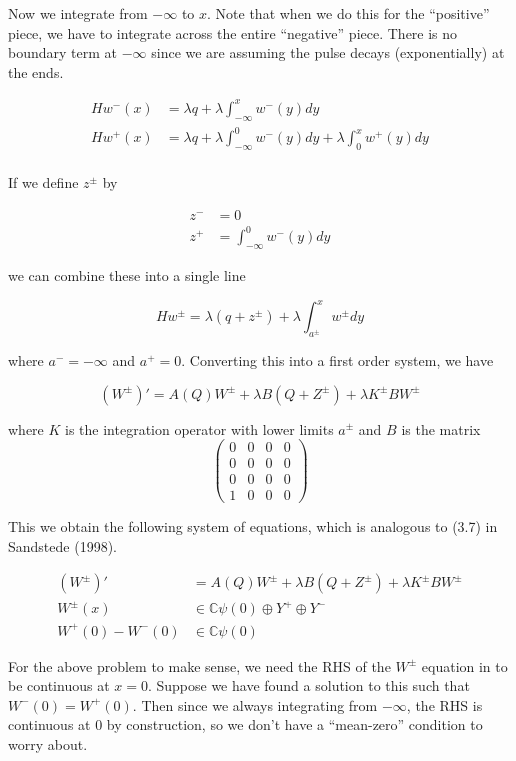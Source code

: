 \documentclass[12pt]{article}
\def\C{{\mathbb C}}
\begin{document}
Now we integrate from $-\infty$ to $x$. Note that when we do this for the ``positive'' piece, we have to integrate across the entire ``negative'' piece. There is no boundary term at $-\infty$ since we are assuming the pulse decays (exponentially) at the ends.

\begin{align*}
H w^-(x) &= \lambda q + \lambda \int_{-\infty}^x w^-(y) dy \\
H w^+(x) &= \lambda q + \lambda \int_{-\infty}^0 w^-(y) dy + \lambda \int_0^x w^+(y) dy \\
\end{align*}

If we define $z^\pm$ by

\begin{align*}
z^- &= 0 \\
z^+ &= \int_{-\infty}^0 w^-(y) dy
\end{align*}

we can combine these into a single line

\[
H w^\pm = \lambda(q + z^\pm) + \lambda \int_{a^\pm}^x w^\pm dy
\]

where $a^- = -\infty$ and $a^+ = 0$. Converting this into a first order system, we have

\begin{equation}
(W^\pm)' = A(Q)W^\pm + \lambda B (Q + Z^\pm) + \lambda K^\pm B W^\pm
\end{equation}

where $K$ is the integration operator with lower limits $a^\pm$ and $B$ is the matrix
\[
\begin{pmatrix}0 & 0 & 0 & 0 \\0 & 0 & 0 & 0 \\0 & 0 & 0 & 0 \\1 & 0 & 0 & 0 \end{pmatrix}
\]


This we obtain the following system of equations, which is analogous to (3.7) in Sandstede (1998).

\begin{align*}\label{inteig1}
(W^\pm)' &= A(Q)W^\pm + \lambda B (Q + Z^\pm) + \lambda K^\pm B W^\pm\\
W^\pm(x) &\in \C \psi(0) \oplus Y^+ \oplus Y^- \\
W^+(0) - W^-(0) &\in \C \psi(0) 
\end{align*}

For the above problem to make sense, we need the RHS of the $W^\pm$ equation in to be continuous at $x = 0$. Suppose we have found a solution to this such that $W^-(0) = W^+(0)$. Then since we always integrating from $-\infty$, the RHS is continuous at 0 by construction, so we don't have a ``mean-zero'' condition to worry about.\\
\end{document}
